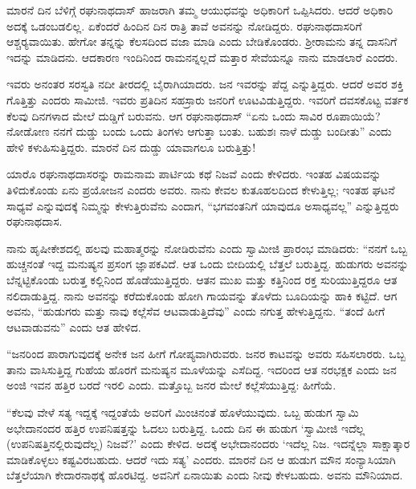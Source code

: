  ಮಾರನೆ ದಿನ ಬೆಳಿಗ್ಗೆ ರಘುನಾಥದಾಸ್ ಹಾಜರಾಗಿ ತಮ್ಮ ಆಯುಧವನ್ನು ಅಧಿಕಾರಿಗೆ ಒಪ್ಪಿಸಿದರು. ಆದರೆ ಅಧಿಕಾರಿ ಅದಕ್ಕೆ ಒಡಂಬಡಲಿಲ್ಲ. ಏಕೆಂದರೆ ಹಿಂದಿನ ದಿನ ರಾತ್ರಿ ತಾವೆ ಅವನನ್ನು ನೋಡಿದ್ದರು. ರಘುನಾಥದಾಸರಿಗೆ ಆಶ್ಚರ‍್ಯವಾಯಿತು. ಹೇಗೋ‌ ತನ್ನನ್ನು ಕೆಲಸದಿಂದ ವಜಾ ಮಾಡಿ ಎಂದು ಬೇಡಿಕೊಂಡರು. ಶ‍್ರೀರಾಮನು ತನ್ನ ದಾಸನಿಗೆ ಇದನ್ನು ಮಾಡಿದನು. ಆದಕಾರಣ ಇಂದಿನಿಂದ ರಾಮನನ್ನಲ್ಲದೆ ಮತ್ತಾರ ಸೇವೆಯನ್ನೂ ನಾನು ಮಾಡಲಾರೆ ಎಂದರು. 

 ಇವರು ಅನಂತರ ಸರಸ್ವತಿ ನದೀ ತೀರದಲ್ಲಿ ಬೈರಾಗಿಯಾದರು. ಜನ ಇವರನ್ನು ಪೆದ್ದ ಎನ್ನುತ್ತಿದ್ದರು. ಆದರೆ ಅವರ ಶಕ್ತಿ ಗೊತ್ತಿತ್ತು ಎಂದರು ಸಾಮೀಜಿ. ಇವರು ಪ್ರತಿದಿನ ಸಹಸ್ರಾರು ಜನರಿಗೆ ಊಟವಿಡುತ್ತಿದ್ದರು. ಇವರಿಗೆ ದವಸಕೊಟ್ಟ ವರ್ತಕ ಕೆಲವು ದಿನಗಳಾದ ಮೇಲೆ ದುಡ್ಡಿಗೆ ಬರುವನು. ಆಗ ರಘುನಾಥದಾಸ್ “ಏನು ಒಂದು ಸಾವಿರ ರೂಪಾಯಿಯೆ? ನೋಡೋಣ ನನಗೆ ದುಡ್ಡು ಬಂದು ಒಂದು ತಿಂಗಳು ಆಗುತ್ತಾ ಬಂತು. ಬಹುಶಃ ನಾಳೆ ದುಡ್ಡು ಬಂದೀತು” ಎಂದು ಹೇಳಿ ಕಳುಹಿಸುತ್ತಿದ್ದರು. ಮಾರನೆ ದಿನ ದುಡ್ಡು ಯಾವಾಗಲೂ ಬರುತ್ತಿತ್ತು! 

\vskip 1pt

 ಯಾರೊ ರಘುನಾಥದಾಸರನ್ನು ರಾಮನಾಮ ಪಾರ್ಟಿಯ ಕಥೆ ನಿಜವೆ ಎಂದು ಕೇಳಿದರು. ಇಂತಹ ವಿಷಯವನ್ನು ತಿಳಿದುಕೊಂಡು ಏನು ಪ್ರಯೋಜನ ಎಂದರು ಅವರು. ನಾನು ಕೇವಲ ಕುತೂಹಲದಿಂದ ಕೇಳುತ್ತಿಲ್ಲ; ಇಂತಹ ಘಟನೆ ಸಾಧ್ಯವೆ ಎನ್ನುವುದಕ್ಕೆ ನಿಮ್ಮನ್ನು ಕೇಳುತ್ತಿರುವೆನು ಎಂದಾಗ, “ಭಗವಂತನಿಗೆ ಯಾವುದೂ ಅಸಾಧ್ಯವಲ್ಲ” ಎನ್ನುತ್ತಿದ್ದರು ರಘುನಾಥದಾಸ. 

\vskip 1pt

 ನಾನು ಹೃಷೀಕೇಶದಲ್ಲಿ ಹಲವು ಮಹಾತ್ಮರನ್ನು ನೋಡಿರುವೆನು ಎಂದು ಸ್ವಾಮೀಜಿ ಪ್ರಾರಂಭ ಮಾಡಿದರು: “ನನಗೆ ಒಬ್ಬ ಹುಚ್ಚನಂತೆ ಇದ್ದ ಮನುಷ್ಯನ ಪ್ರಸಂಗ ಜ್ಞಾಪಕವಿದೆ. ಆತ ಒಂದು ಬೀದಿಯಲ್ಲಿ ಬೆತ್ತಲೆ ಬರುತ್ತಿದ್ದ. ಹುಡುಗರು ಅವನನ್ನು ಬೆನ್ನಟ್ಟಿಕೊಂಡು ಬರುತ್ತ ಕಲ್ಲಿನಿಂದ ಹೊಡೆಯುತ್ತಿದ್ದರು. ಆತನ ಮುಖ ಮತ್ತು ಕತ್ತಿನಿಂದ ರಕ್ತ ಸುರಿಯುತ್ತಿದ್ದರೂ ಆತ ನಲಿದಾಡುತ್ತಿದ್ದ. ನಾನು ಅವನನ್ನು ಕರೆದುಕೊಂಡು ಹೋಗಿ ಗಾಯವನ್ನು ತೊಳೆದು ಬೂದಿಯನ್ನು ಹಾಕಿ ಕಟ್ಟಿದೆ. ಆಗ ಅವನು, “ಹುಡುಗರು ಮತ್ತು ನಾವು ಕಲ್ಲೆಸೆವ ಆಟವಾಡುತ್ತಿದೆವು” ಎಂದು ನಗುತ್ತ ಹೇಳುತ್ತಿದ್ದನು. “ತಂದೆ ಹೀಗೆ ಆಟವಾಡುವನು” ಎಂದು ಆತ ಹೇಳಿದ. 

\vskip 1pt

 “ಜನರಿಂದ ಪಾರಾಗುವುದಕ್ಕೆ ಅನೇಕ ಜನ ಹೀಗೆ ಗೋಪ್ಯವಾಗಿರುವರು. ಜನರ ಕಾಟವನ್ನು ಅವರು ಸಹಿಸಲಾರರು. ಒಬ್ಬ ತಾನು ವಾಸಿಸುತ್ತಿದ್ದ ಗುಹೆಯ ಹೊರಗೆ ಮನುಷ್ಯನ ಮೂಳೆಯನ್ನು ಎಸೆದಿದ್ದ. ಇದರಿಂದ ಆತ ನರಭಕ್ಷಕ ಎಂದು ಜನ ಅಂಜಿ ಇವನ ಹತ್ತಿರ ಬರದೆ ಇರಲಿ ಎಂದು. ಮತ್ತೊಬ್ಬ ಜನರ ಮೇಲೆ ಕಲ್ಲೆಸೆಯುತ್ತಿದ್ದ: ಹೀಗೆಯೆ. 

\vskip 1pt

 “ಕೆಲವು ವೇಳೆ ಸತ್ಯ ಇದ್ದಕ್ಕೆ ಇದ್ದಂತೆಯೆ ಅವರಿಗೆ ಮಿಂಚಿನಂತೆ ಹೊಳೆಯುವುದು. ಒಬ್ಬ ಹುಡುಗ ಸ್ವಾಮಿ ಅಭೇದಾನಂದರ ಹತ್ತಿರ ಉಪನಿಷತ್ತನ್ನು ಓದಲು ಬರುತ್ತಿದ್ದ. ಒಂದು ದಿನ ಈ ಹುಡುಗ ‘ಸ್ವಾಮೀಜಿ ಇದೆಲ್ಲ (ಉಪನಿಷತ್ತಿನಲ್ಲಿರುವುದೆಲ್ಲ) ನಿಜವೆ?’ ಎಂದು ಕೇಳಿದ. ಅದಕ್ಕೆ ಅಭೇದಾನಂದರು ‘ಇದೆಲ್ಲ ನಿಜ. ಇದನ್ನೆಲ್ಲಾ ಸಾಕ್ಷಾತ್ಕಾರ ಮಾಡಿಕೊಳ್ಳಲು ಕಷ್ಟವಿರಬಹುದು. ಆದರೆ ಇದು ಸತ್ಯ’ ಎಂದರು. ಮಾರನೆ ದಿನ ಆ ಹುಡುಗ ಮೌನ ಸಂನ್ಯಾಸಿಯಾಗಿ ಬೆತ್ತಲೆಯಾಗಿ ಕೇದಾರನಾಥಕ್ಕೆ ಹೊರಟಿದ್ದ. ಅವನಿಗೆ ಏನಾಯಿತು ಎಂದು ನೀವು ಕೇಳಬಹುದು. ಅವನು ಮೌನಿಯಾದ. 

